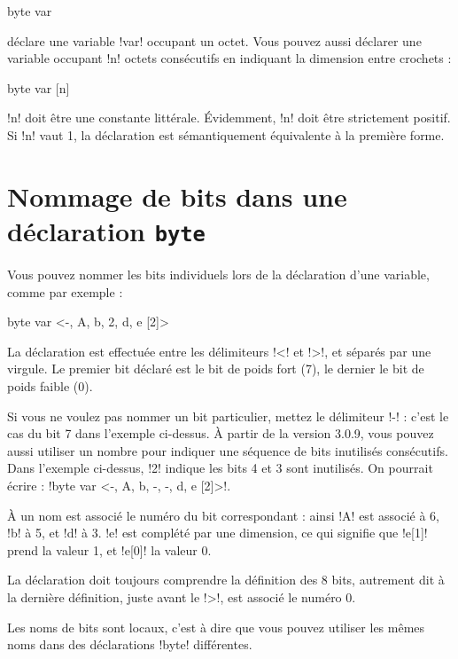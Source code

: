 \begin{piccolo}
byte var 
\end{piccolo}

déclare une variable \pic!var! occupant un octet. Vous pouvez aussi déclarer une variable occupant \pic!n! octets consécutifs en indiquant la dimension entre crochets :

\begin{piccolo}
byte var [n]
\end{piccolo}

\pic!n! doit être une constante littérale. Évidemment, \pic!n! doit être strictement positif. Si \pic!n! vaut 1, la déclaration est sémantiquement équivalente à la première forme.






\section{Nommage de bits dans une déclaration \texttt{byte}}

Vous pouvez nommer les bits individuels lors de la déclaration d'une variable, comme par exemple :

\begin{piccolo}
byte var <-, A, b, 2, d, e [2]>
\end{piccolo}

La déclaration est effectuée entre les délimiteurs \pic!<! et \pic!>!, et séparés par une virgule. Le premier bit déclaré est le bit de poids fort (7), le dernier le bit de poids faible (0).

Si vous ne voulez pas nommer un bit particulier, mettez le délimiteur \pic!-! : c'est le cas du bit 7 dans l'exemple ci-dessus. À partir de la version 3.0.9, vous pouvez aussi utiliser un nombre pour indiquer une séquence de bits inutilisés consécutifs. Dans l'exemple ci-dessus, \pic!2! indique les bits 4 et 3 sont inutilisés. On pourrait écrire : \pic!byte var <-, A, b, -, -, d, e [2]>!.


À un nom est associé le numéro du bit correspondant : ainsi \pic!A! est associé à 6, \pic!b! à 5, et \pic!d! à 3. \pic!e! est complété par une dimension, ce qui signifie que \pic!e[1]! prend la valeur 1, et \pic!e[0]! la valeur 0.

La déclaration doit toujours comprendre la définition des 8 bits, autrement dit à la dernière définition, juste avant le \pic!>!, est associé le numéro 0.

Les noms de bits sont locaux, c'est à dire que vous pouvez utiliser les mêmes noms dans des déclarations \pic!byte! différentes.

